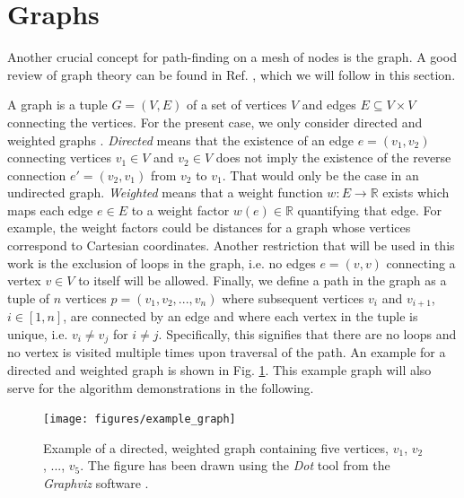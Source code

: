 \section{Graphs}
\label{sec:graphs}
Another crucial concept for path-finding on a mesh of nodes is the graph.
A good review of graph theory can be found in Ref. \cite{FUH_algo_graphs_2021},
which we will follow in this section.

A graph is a tuple $G = \left(V, E\right)$ of a set of vertices $V$ and edges $E \subseteq V \times V$ 
connecting the vertices. For the present case, we only consider directed and weighted graphs 
\cite[pp. 1-3]{FUH_algo_graphs_2021}.
\textit{Directed} means that the existence of an edge $e = \left(v_1, v_2\right)$ connecting vertices 
$v_1 \in V$ and $v_2 \in V$ does not imply the existence of the reverse connection $e'= \left(v_2, v_1\right)$
from $v_2$ to $v_1$. That would only be the case in an undirected graph.
\textit{Weighted} means that a weight function $w: E \rightarrow \mathbb{R}$ exists which maps each 
edge $e \in E$ to a weight factor $w\left(e\right) \in \mathbb{R}$ quantifying that edge. 
For example, the weight factors could be distances for a graph whose vertices correspond to Cartesian coordinates.
Another restriction that will be used in this work is the exclusion of loops in the graph, i.e.
no edges $e = \left(v, v\right)$ connecting a vertex $v \in V$ to itself will be allowed.
Finally, we define a path in the graph as a tuple of $n$ vertices $p = \left(v_1, v_2, ..., v_n\right)$
where subsequent vertices $v_i$ and $v_{i+1}$, $i \in \left[1, n\right]$, are connected by an edge and 
where each vertex in the tuple is unique, i.e. $v_i \neq v_j$ for $i \neq j$.
Specifically, this signifies that there are no loops and no vertex is visited multiple times upon 
traversal of the path.
An example for a directed and weighted graph is shown in Fig. \ref{fig:example_graph}.
This example graph will also serve for the algorithm demonstrations in the following.

\begin{figure}[h]
	\begin{center}
		\texttt{[image: figures/example\_graph]}
	\end{center}
	\caption[Example graph.]{
		Example of a directed, weighted graph containing five vertices, $v_1$, $v_2$, ..., $v_5$.
		The figure has been drawn using the \textit{Dot} tool from the \textit{Graphviz} software \cite{Ellson2003}.
		\label{fig:example_graph}}
\end{figure}


